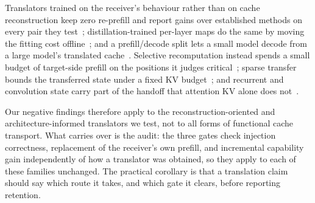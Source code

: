 \documentclass[10pt]{article}
\newcommand{\kv}{\ensuremath{\mathrm{KV}}}
\begin{document}
Translators trained on the receiver's behaviour rather than on cache
reconstruction keep zero re-prefill and report gains over established methods on
every pair they test~\citep{cachelink2026}; distillation-trained per-layer maps
do the same by moving the fitting cost offline~\citep{kvlingo2026}; and a
prefill/decode split lets a small model decode from a large model's translated
cache~\citep{bridgekv2026}. Selective recomputation instead spends a small
budget of target-side prefill on the positions it judges
critical~\citep{raracache2026}; sparse transfer bounds the transferred state
under a fixed \kv{} budget~\citep{acct2026}; and recurrent and convolution state
carry part of the handoff that attention \kv{} alone does
not~\citep{latentport2026}.

Our negative findings therefore apply to the reconstruction-oriented and
architecture-informed translators we test, not to all forms of functional cache
transport. What carries over is the audit: the three gates check injection
correctness, replacement of the receiver's own prefill, and incremental
capability gain independently of how a translator was obtained, so they apply to
each of these families unchanged. The practical corollary is that a translation
claim should say which route it takes, and which gate it clears, before
reporting retention.
\end{document}

